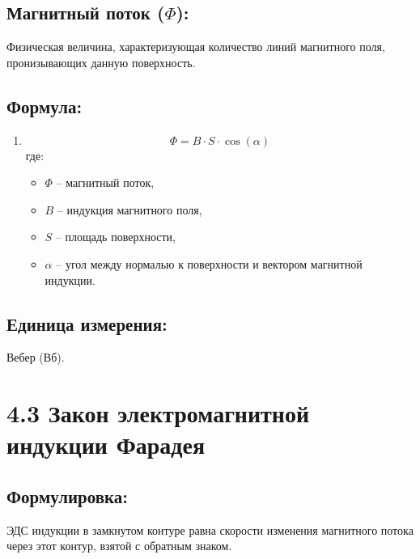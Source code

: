 \documentclass[a4paper,12pt]{article}
\begin{document}
\subsection*{Магнитный поток ($\Phi$):}
\vspace{-3pt}
Физическая величина, характеризующая количество линий магнитного поля, пронизывающих данную поверхность.

\vspace{-9pt}
\subsection*{Формула:}
\vspace{-3pt}
\begin{enumerate}[itemsep=0pt, topsep=0pt, parsep=3pt]
  \item 
  \vspace{-0.05em}
  $$ \Phi = B \cdot S \cdot \cos(\alpha) $$
  где:
  \begin{itemize}
    \item $\Phi$ – магнитный поток,
    \item $B$ – индукция магнитного поля,
    \item $S$ – площадь поверхности,
    \item $\alpha$ – угол между нормалью к поверхности и вектором магнитной индукции.
  \end{itemize}
\end{enumerate}

\vspace{-9pt}
\subsection*{Единица измерения:}
\vspace{-3pt}
Вебер (Вб).

\section*{4.3 Закон электромагнитной индукции Фарадея}
\vspace{-9pt}
\subsection*{Формулировка:}
\vspace{-3pt}
ЭДС индукции в замкнутом контуре равна скорости изменения магнитного потока через этот контур, взятой с обратным знаком.

\vspace{-9pt}
\end{document}
